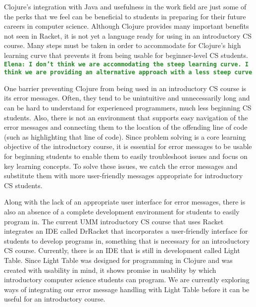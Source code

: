 \documentclass[12pt]{article}
\newcommand{\comment}[1]{{\bf \tt  {#1}}}
\newcommand{\emcomment}[1]{\textcolor{ForestGreen}{\comment{Elena: {#1}}}}
\begin{document}
Clojure’s integration with Java and usefulness in the work field are just some of the perks that we feel can be beneficial to students in preparing for their future careers in computer science.  Although Clojure provides many important benefits not seen in Racket, it is not yet a language ready for using in an introductory CS course. %
Many steps must be taken in order to accommodate for Clojure's high learning curve that prevents it from being usable for beginner-level CS students. \emcomment{I don't think we are accommodating the steep learning curve. I think we are providing an alternative approach with a less steep curve} 

One barrier preventing Clojure from being used in an introductory CS course is its error messages. Often, they tend to be unintuitive and unnecessarily long and can be hard to understand for experienced programmers, much less beginning CS students. Also, there is not an environment that supports easy navigation of the error messages and connecting them to the location of the offending line of code (such as highlighting that line of code). Since problem solving is a core learning objective of the introductory course, it is essential for error messages to be usable for beginning students to enable them to easily troubleshoot issues and focus on key learning concepts. To solve these issues, we catch the error messages and substitute them with more user-friendly messages appropriate for introductory CS students. 

Along with the lack of an appropriate user interface for error messages, there is also an absence of a complete development environment for students to easily program in. The current UMM introductory CS course that uses Racket integrates an IDE called DrRacket that incorporates a user-friendly interface for students to develop programs in, something that is necessary for an introductory CS course.  Currently, there is an IDE that is still in development called Light Table.  Since Light Table was designed for programming in Clojure and was created with usability in mind, it shows promise in usability by which introductory computer science students can program. We are currently exploring ways of integrating our error message handling with Light Table before it can be useful for an introductory course. 
\end{document}
